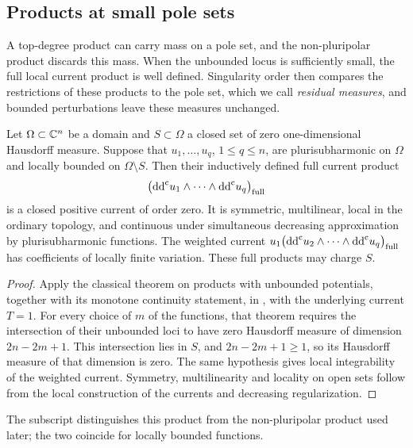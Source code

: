 \subsection{Products at small pole sets}
\label{subsec:small-pole-local-products}

A top-degree product can carry mass on a pole set, and the non-pluripolar product discards this mass. When the unbounded locus is sufficiently small, the full local current product is well defined. Singularity order then compares the restrictions of these products to the pole set, which we call \emph{residual measures}, and bounded perturbations leave these measures unchanged.

\begin{theorem}\label{thm:small-pole-local-products}
Let $\Omega\subset\mathbb C^n$ be a domain and $S\subset\Omega$ a closed set of zero one-dimensional Hausdorff measure. Suppose that $u_1,\ldots,u_q$, $1\leq q\leq n$, are plurisubharmonic on $\Omega$ and locally bounded on $\Omega\setminus S$. Then their inductively defined full current product
\[
 \bigl(\mathrm{dd}^{\mathrm{c}} u_1\wedge\cdots\wedge\mathrm{dd}^{\mathrm{c}} u_q\bigr)_{\mathrm{full}}
\]
is a closed positive current of order zero. It is symmetric, multilinear, local in the ordinary topology, and continuous under simultaneous decreasing approximation by plurisubharmonic functions. The weighted current
$u_1\bigl(\mathrm{dd}^{\mathrm{c}} u_2\wedge\cdots\wedge\mathrm{dd}^{\mathrm{c}} u_q\bigr)_{\mathrm{full}}$
has coefficients of locally finite variation. These full products may charge $S$.
\end{theorem}
\begin{proof}
Apply the classical theorem on products with unbounded potentials, together with its monotone continuity statement, in \cite[Chapter III, Theorem~4.5 and Proposition~4.9, pp.~152--156]{DemCADG}, with the underlying current $T=1$. For every choice of $m$ of the functions, that theorem requires the intersection of their unbounded loci to have zero Hausdorff measure of dimension $2n-2m+1$. This intersection lies in $S$, and $2n-2m+1\geq1$, so its Hausdorff measure of that dimension is zero. The same hypothesis gives local integrability of the weighted current. Symmetry, multilinearity and locality on open sets follow from the local construction of the currents and decreasing regularization.
\end{proof}

The subscript distinguishes this product from the non-pluripolar product used later; the two coincide for locally bounded functions.

